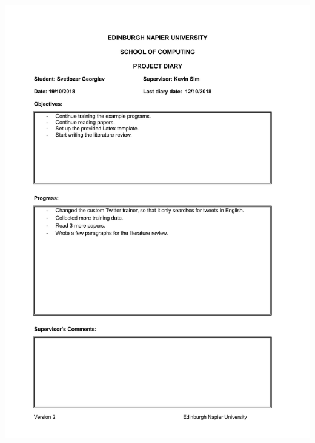 \documentclass[12pt,a4paper]{article}
\begin{document}
\begin{appendices}
\includegraphics[width=\textwidth,height=\textheight,keepaspectratio]{week6.jpg}
\newpage

\end{appendices}
\end{document}
